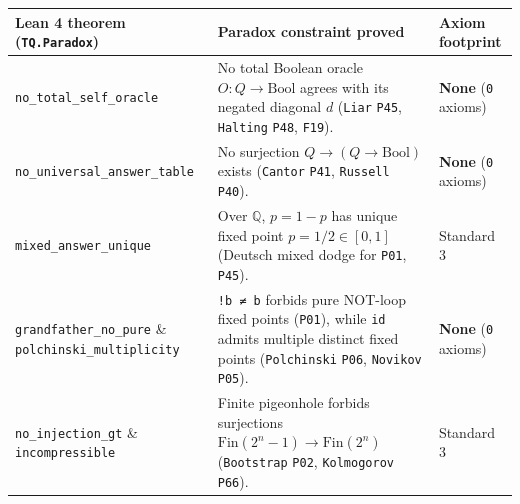 \documentclass[10pt,letterpaper]{article}
\newcounter{none}
\begin{document}
{\def\LTcaptype{none} %
{\footnotesize\setlength{\tabcolsep}{3.8pt}\renewcommand{\arraystretch}{1.15}
\begin{longtable}[]{@{}
  >{\raggedright\arraybackslash}p{}
  >{\raggedright\arraybackslash}p{}
  >{\raggedright\arraybackslash}p{}@{}}
\toprule\noalign{}
\begin{minipage}[b]{\linewidth}\raggedright
\textbf{Lean 4 theorem (\texttt{TQ.\allowbreak{}Paradox})}
\end{minipage} & \begin{minipage}[b]{\linewidth}\raggedright
\textbf{Paradox constraint proved}
\end{minipage} & \begin{minipage}[b]{\linewidth}\raggedright
\textbf{Axiom footprint}
\end{minipage} \\
\midrule\noalign{}
\endhead
\bottomrule\noalign{}
\endlastfoot
\texttt{no\_\allowbreak{}total\_\allowbreak{}self\_\allowbreak{}oracle} & No total Boolean oracle
\(O : Q \to \mathrm{Bool}\) agrees with its negated diagonal \(d\)
(\texttt{Liar} \texttt{P45}, \texttt{Halting} \texttt{P48},
\texttt{F19}). & \textbf{None} (\texttt{0} axioms) \\
\texttt{no\_\allowbreak{}universal\_\allowbreak{}answer\_\allowbreak{}table} & No surjection
\(Q \to (Q \to \mathrm{Bool})\) exists (\texttt{Cantor} \texttt{P41},
\texttt{Russell} \texttt{P40}). & \textbf{None} (\texttt{0} axioms) \\
\texttt{mixed\_\allowbreak{}answer\_\allowbreak{}unique} & Over \(\mathbb{Q}\), \(p = 1 - p\) has
unique fixed point \(p = 1/2 \in [0, 1]\) (Deutsch mixed dodge for
\texttt{P01}, \texttt{P45}). & Standard 3 \\
\texttt{grandfather\_\allowbreak{}no\_\allowbreak{}pure} \& \texttt{polchinski\_\allowbreak{}multiplicity} &
\texttt{!b\ ≠\ b} forbids pure NOT-loop fixed points (\texttt{P01}),
while \texttt{id} admits multiple distinct fixed points
(\texttt{Polchinski} \texttt{P06}, \texttt{Novikov} \texttt{P05}). &
\textbf{None} (\texttt{0} axioms) \\
\texttt{no\_\allowbreak{}injection\_\allowbreak{}gt} \& \texttt{incompressible} & Finite
pigeonhole forbids surjections
\(\mathrm{Fin}(2^n - 1) \to \mathrm{Fin}(2^n)\) (\texttt{Bootstrap}
\texttt{P02}, \texttt{Kolmogorov} \texttt{P66}). & Standard 3 \\

\end{longtable}}}
\end{document}
